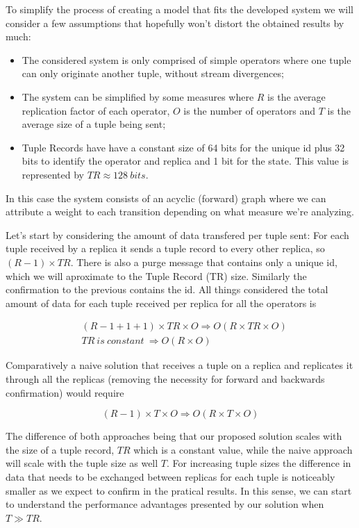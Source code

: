 \documentclass[times, 10pt,twocolumn]{article}
\begin{document}
To simplify the process of creating a model that fits the developed system
we will consider a few assumptions that hopefully won't distort the
obtained results by much:
 \begin{itemize} \item The considered system is
			only comprised of simple operators where one tuple can only
		originate another tuple, without stream divergences; \item The system
			can be simplified by some measures where $R$ is the average
			replication factor of each operator, $O$ is the number of operators
		and $T$ is the average size of a tuple being sent; \item Tuple Records
			have have a constant size of 64 bits for the unique id plus 32 bits
			to identify the operator and replica and 1 bit for the state.  This
			value is represented by $TR \approx 128\ bits$.  \end{itemize} In
	this case the system consists of an acyclic (forward) graph where we can
	attribute a weight to each transition depending on what measure we're
	analyzing.

Let's start by considering the amount of data transfered per tuple sent:
For each tuple received by a replica it sends a tuple record to every
other replica, so $(R-1)\times TR$. There is also a purge message that
contains only a unique id, which we will aproximate to the Tuple Record
(TR) size. Similarly the confirmation to the previous contains the id. All
things considered the total amount of data for each tuple received per
replica for all the operators is 


\begin{eqnarray*} &(R - 1 + 1 + 1) \times TR \times O \Rightarrow O(R
	\times TR \times O) \\ &TR\ is\ constant\ \Rightarrow O(R \times O)
\end{eqnarray*}

Comparatively a naive solution that receives a tuple on a replica and
replicates it through all the replicas (removing the necessity for forward
and backwards confirmation) would require 

\[ (R-1)\times T \times O \Rightarrow O(R \times T \times O)\]

The difference of both approaches being that our proposed solution scales
with the size of a tuple record, $TR$ which is a constant value, while the
naive approach will scale with the tuple size as well $T$. For increasing
tuple sizes the difference in data that needs to be exchanged between
replicas for each tuple is noticeably smaller as we expect to confirm in
the pratical results. In this sense, we can start to understand the
performance advantages presented by our solution when $T \gg TR$.
\end{document}
